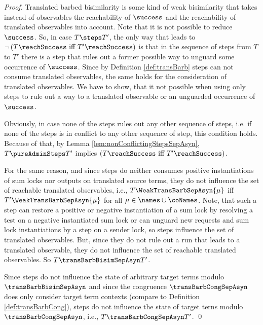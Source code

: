 \documentclass[]{llncs}
\begin{document}
\begin{proof}
	Translated barbed bisimilarity is some kind of weak bisimilarity that takes instead of observables the reachability of $ \success $ and the reachability of translated observables into account. Note that it is not possible to reduce $ \success $. So, in case $ T \steps T' $, the only way that leads to $ \neg\left( T\reachSuccess \text{ iff } T'\reachSuccess \right) $ is that in the sequence of steps from $ T $ to $ T' $ there is a step that rules out a former possible way to unguard some occurrence of $ \success $. Since by Definition \ref{def:transBarb} \pure \admin steps can not consume translated observables, the same holds for the consideration of translated observables. We have to show, that it not possible when using only \pure \admin steps to rule out a way to a translated observable or an unguarded occurrence of $ \success $.
	
	Obviously, in case none of the \pure \admin steps rules out any other sequence of steps, i.e. if none of the \admin steps is in conflict to any other sequence of step, this condition holds. Because of that, by Lemma \ref{lem:nonConflictingStepsSepAsyn}, $ T \pureAdminSteps T' $ implies $ \left( T\reachSuccess \text{ iff } T'\reachSuccess \right) $.
	
	For the same reason, and since \pure \admin steps do neither consumes positive instantiations of sum locks nor outputs on translated source terms, they do not influence the set of reachable translated observables, i.e., $ T \WeakTransBarbSepAsyn{\mu} $ iff $ T' \WeakTransBarbSepAsyn{\mu} $ for all $ \mu \in \names \cup \coNames $. Note, that such a step can restore a positive or negative instantiation of a sum lock by resolving a test on a negative instantiated sum lock or can unguard new requests and sum lock instantiations by a step on a sender lock, so \pure \admin steps influence the set of translated observables. But, since they do not rule out a run that leads to a translated observable, they do not influence the set of reachable translated observables. So $ T \transBarbBisimSepAsyn T' $.
	
	Since \pure \admin steps do not influence the state of arbitrary target terms modulo $ \transBarbBisimSepAsyn $ and since the congruence $ \transBarbCongSepAsyn $ does only consider target term contexts (compare to Definition \ref{def:transBarbCong}), \pure \admin steps do not influence the state of target terns modulo $ \transBarbCongSepAsyn $, i.e., $ T \transBarbCongSepAsyn T' $.
	\qed
\end{proof}
\end{document}
